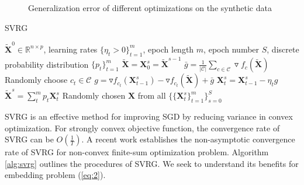 \documentclass[letterpaper]{article}
\begin{document}
\begin{figure}
{			}
			\caption{Generalization error of different optimizations on the synthetic data}
			\label{fig:1} %
		\end{figure}

		\begin{algorithm}
			\caption{SVRG}\label{alg:svrg}
			\begin{algorithmic}[1]
				\Require $\tilde{\mathbf{X}}^0\in\mathbb{R}^{n\times p}$, learning rates $\{\eta_t>0\}^{m}_{t=1}$, epoch length $m$, epoch number $S$, discrete probability distribution $\{p_t\}^m_{t=1}$
					\State $\tilde{\mathbf{X}} = \mathbf{X}^s_0 =\tilde{\mathbf{X}}^{s-1}$
					\State $\bar{g} = \frac{1}{|\mathcal{C}|}\underset{c\in\mathcal{C}}{\sum}\triangledown f_c(\tilde{\mathbf{X}})$
						\State Randomly choose $c_t\in\mathcal{C}$
						\State $g=\triangledown f_{c_t}(\mathbf{X}^s_{t-1})-\triangledown f_{c_t}(\tilde{\mathbf{X}})+\bar{g}$
						\State $\mathbf{X}^s_{t}= \mathbf{X}^s_{t-1}-\eta_t g$
					\EndFor
					\State $\tilde{\mathbf{X}}^{s}=\sum^{m}_{t}p_{t}\mathbf{X}^s_{t}$
				\EndFor
				\Ensure Randomly chosen $\mathbf{X}$ from all $\{\{\mathbf{X}^s_t\}^m_{t=1}\}^S_{s=0}$
			\end{algorithmic}
		\end{algorithm}

		SVRG \cite{rie2013accelerating} is an effective method for improving SGD by reducing variance in convex optimization. For strongly convex objective function, the convergence rate of SVRG can be $O(\frac{1}{T})$. A recent work \cite{reddic2016nonconvex} establishes the non-asymptotic convergence rate of SVRG for non-convex finite-sum optimization problem. Algorithm \ref{alg:svrg} outlines the procedures of SVRG. We seek to understand its benefits for embedding problem (\ref{eq:2}).
\end{document}
